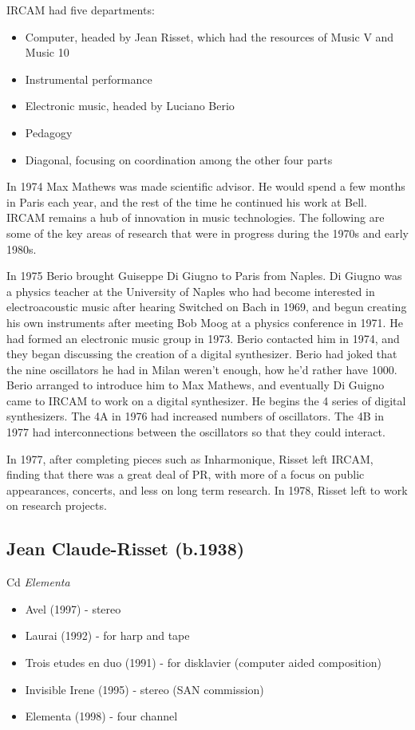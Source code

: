 IRCAM had five departments:
\begin{itemize}
\item Computer, headed by Jean Risset, which had the resources of Music V and Music 10
\item Instrumental performance
\item Electronic music, headed by Luciano Berio
\item Pedagogy
\item Diagonal, focusing on coordination among the other four parts
\end{itemize}

In 1974 Max Mathews was made scientific advisor. He would spend a few months in Paris each year, and the rest of the time he continued his work at Bell. IRCAM remains a hub of innovation in music technologies. The following are some of the key areas of research that were in progress during the 1970s and early 1980s.

In 1975 Berio brought Guiseppe Di Giugno to Paris from Naples. Di Giugno was a physics teacher at the University of Naples who had become interested in electroacoustic music after hearing Switched on Bach in 1969, and begun creating his own instruments after meeting Bob Moog at a physics conference in 1971. He had formed an electronic music group in 1973. Berio contacted him in 1974, and they began discussing the creation of a digital synthesizer. Berio had joked that the nine oscillators he had in Milan weren't enough, how he'd rather have 1000. Berio arranged to introduce him to Max Mathews, and eventually Di Guigno came to IRCAM to work on a digital synthesizer. He begins the 4 series of digital synthesizers. The 4A in 1976 had increased numbers of oscillators. The 4B in 1977 had interconnections between the oscillators so that they could interact.

In 1977, after completing pieces such as Inharmonique, Risset left IRCAM, finding that there was a great deal of PR, with more of a focus on public appearances, concerts, and less on long term research. In 1978, Risset left to work on research projects.

\subsection{Jean Claude-Risset (b.1938)} 
Cd \textit{Elementa}
\begin{itemize}
\item Avel (1997) - stereo
\item Laurai (1992) - for harp and tape
\item Trois etudes en duo (1991) - for disklavier (computer aided composition)
\item Invisible Irene (1995) - stereo (SAN commission)
\item Elementa (1998) - four channel
\end{itemize}

